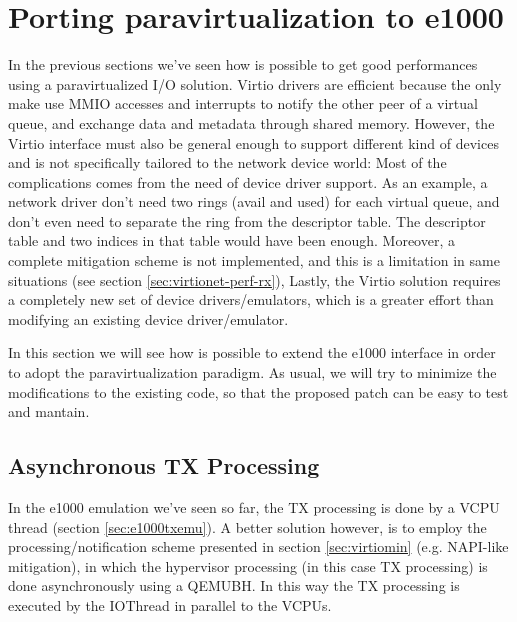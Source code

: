 \section{Porting paravirtualization to e1000}
In the previous sections we've seen how is possible to get good performances using a paravirtualized I/O solution. Virtio drivers are
efficient because the only make use MMIO accesses and interrupts to notify the other peer of a virtual queue, and exchange data and
metadata through shared memory.
However, the Virtio interface must also be general enough to support different kind of devices and is not specifically tailored to the
network device world: Most of the complications comes from the need of device driver support. As an example, a network driver don't need
two rings (avail and used) for each virtual queue, and don't even need to separate the ring from the descriptor table. The descriptor
table and two indices in that table would have been enough.
Moreover, a complete mitigation scheme is not implemented, and this is a limitation in same situations (see section
\ref{sec:virtionet-perf-rx}),
Lastly, the Virtio solution requires a completely new set of device drivers/emulators, which is a greater effort than modifying
an existing device driver/emulator.

\vspace{0.5cm}

In this section we will see how is possible to extend the e1000 interface in order to adopt the paravirtualization paradigm.
As usual, we will try to minimize the modifications to the existing code, so that the proposed patch can be easy to test and mantain.


\subsection{Asynchronous TX Processing}
\label{sec:e1000-par-async}
In the e1000 emulation we've seen so far, the TX processing is done by a VCPU thread (section \ref{sec:e1000txemu}).
A better solution however, is to employ the processing/notification scheme presented in section \ref{sec:virtiomin} (e.g. NAPI-like 
mitigation), in which the hypervisor processing (in this case TX processing) is done asynchronously using a QEMUBH.
In this way the TX processing is executed by the IOThread in parallel to the VCPUs.


